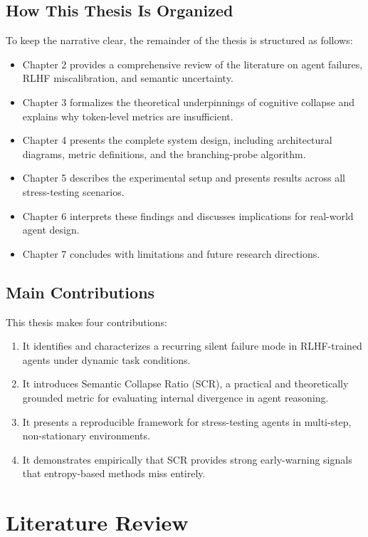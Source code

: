 \documentclass[12pt,a4paper]{report}
\begin{document}
\section{How This Thesis Is Organized}
To keep the narrative clear, the remainder of the thesis is structured as follows:
\begin{itemize}
    \item Chapter 2 provides a comprehensive review of the literature on agent failures, RLHF miscalibration, and semantic uncertainty.
    \item Chapter 3 formalizes the theoretical underpinnings of cognitive collapse and explains why token-level metrics are insufficient.
    \item Chapter 4 presents the complete system design, including architectural diagrams, metric definitions, and the branching-probe algorithm.
    \item Chapter 5 describes the experimental setup and presents results across all stress-testing scenarios.
    \item Chapter 6 interprets these findings and discusses implications for real-world agent design.
    \item Chapter 7 concludes with limitations and future research directions.
\end{itemize}

\section{Main Contributions}
This thesis makes four contributions:
\begin{enumerate}
    \item It identifies and characterizes a recurring silent failure mode in RLHF-trained agents under dynamic task conditions.
    \item It introduces Semantic Collapse Ratio (SCR), a practical and theoretically grounded metric for evaluating internal divergence in agent reasoning.
    \item It presents a reproducible framework for stress-testing agents in multi-step, non-stationary environments.
    \item It demonstrates empirically that SCR provides strong early-warning signals that entropy-based methods miss entirely.
\end{enumerate}

\chapter{Literature Review}
\end{document}
